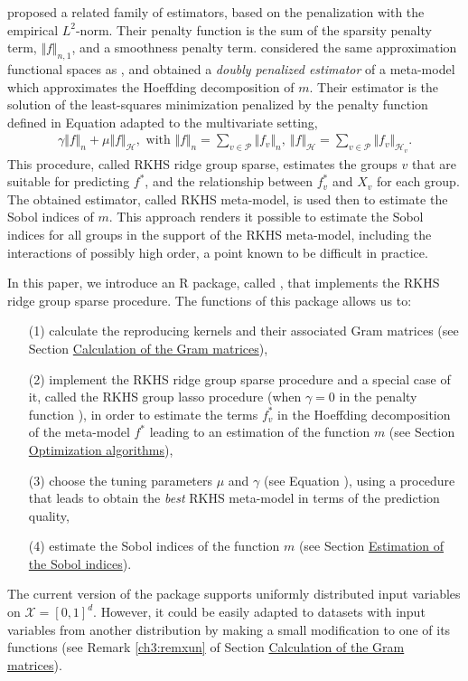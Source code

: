 \citet{meier2009} proposed a related family of estimators, based on the penalization with the empirical $L^2$-norm. Their penalty function is the sum of the sparsity penalty term, $\Vert f\Vert_{n,1}$, and a smoothness penalty term. 
\citet{huet:hal-01434895} considered the same approximation functional spaces as \citet{DURRANDE201357}, and obtained a \textit{doubly penalized estimator} of a meta-model which approximates the Hoeffding decomposition of $m$. Their estimator is the solution of the least-squares minimization penalized by the penalty function defined in Equation  adapted to the multivariate setting,
\begin{align}
\label{ch3pen}
\gamma\Vert f\Vert_{n}+\mu\Vert f\Vert_{\mathcal{H}},\mbox{ with }\Vert f\Vert_{n}=\sum_{v\in\mathcal{P}}\Vert f_v\Vert_{n},\:\Vert f\Vert_{\mathcal{H}}=\sum_{v\in\mathcal{P}}\Vert f_v\Vert_{\mathcal{H}_v}.
\end{align}
This procedure, called RKHS ridge group sparse, estimates the groups $v$ that are suitable for predicting $f^*$, and the relationship between $f^*_v$ and $X_v$ for each group. 
The obtained estimator, called RKHS meta-model, is used then to estimate the Sobol indices of $m$. This approach renders it possible to estimate the Sobol indices for all groups in the support of the RKHS meta-model, including the interactions of possibly high order, a point known to be difficult in practice. 

In this paper, we introduce an R package, called , that implements the RKHS ridge group sparse procedure. 
The functions of this package allows us to:
\begin{itemize}
\item[(1)] calculate the reproducing kernels and their associated Gram matrices (see Section \hyperref[subsec:Gramm]{Calculation of the Gram matrices}), 
\item[(2)] implement the RKHS ridge group sparse procedure and a special case of it, called the RKHS group lasso procedure (when $\gamma=0$ in the penalty function ), in order to estimate the terms $f^*_v$ in the Hoeffding decomposition of the meta-model $f^*$ leading to an estimation of the function $m$ (see Section \hyperref[subsec:optim]{Optimization algorithms}), 
\item[(3)] choose the tuning parameters $\mu$ and $\gamma$ (see Equation ), using a procedure that leads to obtain the \textit{best} RKHS meta-model in terms of the prediction quality,
\item[(4)] estimate the Sobol indices of the function $m$ (see Section \hyperref[subsec:SI]{Estimation of the Sobol indices}).
\end{itemize}
The current version of the package supports uniformly distributed input variables on $\mathcal{X}=[0,1]^d$. However, it could be easily adapted to datasets with input variables from another distribution by making a small modification to one of its functions (see Remark \ref{ch3:remxun} of Section \hyperref[subsec:Gramm]{Calculation of the Gram matrices}).

